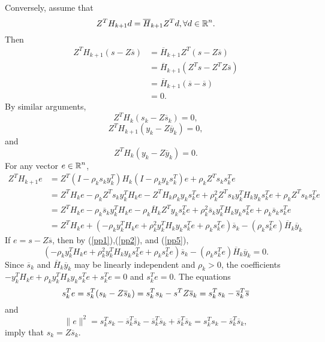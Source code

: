 {Conversely, assume that
\[ Z^T {H}_{k+1} d =  \overline{H}_{k+1} Z^T d ,  \forall d \in \mbox{${\mathbb R}$}^n.\]
Then 
\begin{equation} \label{pp1}
 \begin{array}{ll}
Z^T {H}_{k+1} ( s - Z \overline{s} )  &= \overline{H}_{k+1} Z^T  ( s - Z \overline{s} ) \\
&= \overline{H}_{k+1} (Z^T s - Z^T Z \overline{s} ) \\
&= \overline{H}_{k+1} ( \overline{s} - \overline{s}) \\
&= 0.
\end{array} \end{equation}
By similar arguments,
\begin{equation} \label{pp2} Z^T {H}_{k} ( s_k - Z \overline{s}_k ) = 0, \end{equation}
\begin{equation} \label{pp3} Z^T {H}_{k+1} ( y_k - Z \overline{y}_k ) = 0, \end{equation}
and
\begin{equation} \label{pp4} Z^T {H}_{k} ( y_k - Z \overline{y}_k ) = 0. \end{equation}
For any vector $e \in \mbox{${\mathbb R}$}^n$,
\begin{equation} \label{pp5}
\begin{array}{ll}
Z^T {H}_{k+1} e
&= Z^T (I - \rho_k s_k y_k^T) H_k (I - \rho_k y_k s_k^T) e + \rho_k Z^T s_k s_k^T e \\
&= Z^T H_k e - \rho_k Z^T s_k y_k^T H_k e - Z^T H_k \rho_k y_k s_k^T e + \rho_k^2  Z^T s_k y_k^T H_k y_k s_k^T e + \rho_k Z^T s_k s_k^T e \\
&= Z^T H_k e  - \rho_k \overline{s}_k y_k^T H_k e - \rho_k  \overline{H}_k Z^T y_k s_k^T e + \rho_k^2 \overline{s}_k y_k^T H_k y_k s_k^T e + \rho_k \overline{s}_k s_k^T e \\
&= Z^T H_k e + ( -\rho_k y_k^T H_k e + \rho_k^2 y_k^T H_k y_k s_k^T e  +\rho_k s_k^T e ) \overline{s}_k -
(  \rho_k s_k^T e )  \overline{H}_k \overline{y}_k
\end{array}
\end{equation}
If $e = s - Z \overline{s}$, then by (\ref{pp1}),(\ref{pp2}), and (\ref{pp5}), 
\[ ( -\rho_k y_k^T H_k e + \rho_k^2 y_k^T H_k y_k s_k^T e  +\rho_k s_k^T e ) \overline{s}_k -
(  \rho_k s_k^T e )  \overline{H}_k \overline{y}_k = 0 . \]
Since $ \overline{s}_k$ and $\overline{H}_k \overline{y}_k$
may be linearly independent and $\rho_k > 0$, the coefficients
$ - y_k^T H_k e + \rho_k y_k^T H_k y_k s_k^T e  + s_k^T e = 0 $
and $ s_k^T e = 0$.
The equations
\[
s_k^T e = s_k^T (s_k - Z  \overline{s}_k)
= s_k^T s_k - s^T Z \overline{s}_k
= s_k^T s_k - \overline{s}_k^T \overline{s} \\
\]
and
\[ \| e \|^2  = s_k^Ts_k - \overline{s}_k^T \overline{s}_k - \overline{s}_k^T \overline{s}_k +  \overline{s}_k^T \overline{s}_k 
= s_k^Ts_k - \overline{s}_k^T \overline{s}_k,\]
imply that
$s_k = Z \overline{s}_k$.

}

